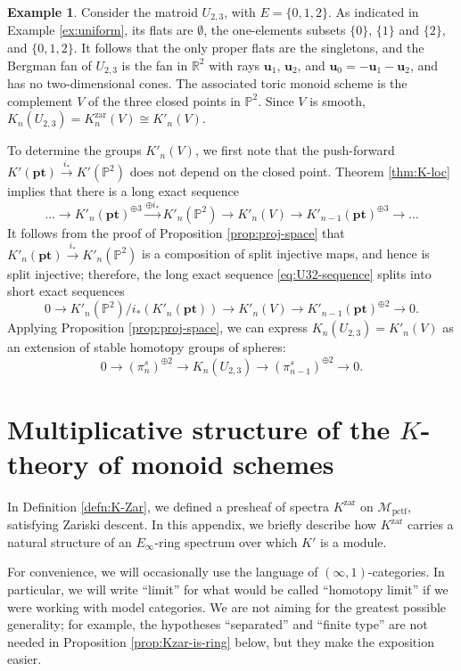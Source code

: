 \documentclass[12pt]{amsart}
\def\cMpctf{{\mathcal M}_{\text{pctf}}}
\def\Kzar{K^{\mathrm{zar}}}
\newcommand{\R}{\mathbb{R}}
\newcommand{\bbP}{\mathbb{P}}
\newcommand{\bu}{\mathbf{u}}
\newcommand{\pt}{\mathbf{pt}}
\numberwithin{equation}{section}
\theoremstyle{plain}
\theoremstyle{definition}
\newtheorem{ex}[equation]{Example}
\theoremstyle{remark}
\begin{document}
\begin{ex}\label{ex:K-of-U_{2,3}}
Consider the matroid $U_{2,3}$, with $E=\{0,1,2\}$. As indicated in
Example \ref{ex:uniform}, its flats are $\emptyset$, the one-elements
subsets $\{0\}$, $\{1\}$ and $\{2\}$, and $\{0,1,2\}$. It follows that
the only proper flats are the singletons, and the Bergman fan of
$U_{2,3}$ is the fan in $\R^2$ with rays $\bu_1$, $\bu_2$, and $\bu_0
= -\bu_1 - \bu_2$, and has no two-dimensional cones. The associated toric
monoid scheme is the complement $V$ of the three closed points in
$\bbP^2$.  Since $V$ is smooth, $K_n(U_{2,3}) = \Kzar_n(V)\cong
K'_n(V)$.

To determine the groups $K'_n(V)$, we first note that the push-forward
$K'(\pt)\xrightarrow{i_*} K'(\bbP^2)$ does not depend on the closed
point. Theorem \ref{thm:K-loc} implies that there is a long exact
sequence
\begin{equation}\label{eq:U32-sequence}
	 \dotsc\to K'_n(\pt)^{\oplus 3}\xrightarrow{\oplus i_*} K'_n(\bbP^2)\to K'_n(V) \to K'_{n-1}(\pt)^{\oplus 3}\to \dotsc 
\end{equation}
It follows from the proof of Proposition \ref{prop:proj-space} that
$K'_n(\pt)\xrightarrow{i_*} K'_n(\bbP^2)$ is a composition of split
injective maps, and hence is split injective; therefore, the long
exact sequence \eqref{eq:U32-sequence} splits into short exact
sequences
\[
0\to K'_n(\bbP^2)/i_* \left(K'_n(\pt)\right) \to K'_n(V)\to K'_{n-1}(\pt)^{\oplus 2}\to 0.
\]
Applying Proposition \ref{prop:proj-space}, we can express
$K_n(U_{2,3}) = K'_n(V)$ as an
extension of stable homotopy groups of spheres:
\[
0\to (\pi_n^s)^{\oplus 2} \to K_n(U_{2,3})\to (\pi_{n-1}^s)^{\oplus 2}\to 0.
\] 
 \end{ex}


\vspace{1cm}
\appendix 
\section{Multiplicative structure of
  the $K$-theory of monoid schemes}\label{app:mult}

In Definition \ref{defn:K-Zar}, we defined a presheaf of spectra
$\Kzar$ on $\cMpctf$, satisfying Zariski descent. In this appendix, we
briefly describe how $\Kzar$ carries a natural structure of an
$E_\infty$-ring spectrum over which $K'$ is a module.

For convenience,
we will occasionally use the language of $(\infty,1)$-categories. In
particular, we will write ``limit'' for what would be called
``homotopy limit'' if we were working with model categories. We are
not aiming for the greatest possible generality; for example, the
hypotheses ``separated'' and ``finite type'' are not needed in
Proposition \ref{prop:Kzar-is-ring} below, but they make the
exposition easier.
\end{document}
